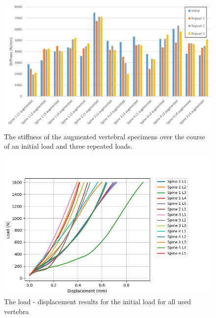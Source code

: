 \begin{figure}[ht!]
  \centering
 
\includegraphics[width=\textwidth]{Chapters/Chapter_HT_images/experimental_repeats.png}
  \caption{The stiffness of the augmented vertebral specimens over the course
    of an initial load and three repeated loads.}
  \label{fig:exp_repeats}
\end{figure}


\begin{figure}[ht!]
  \centering
  \includegraphics[width=\textwidth]{Chapters/Chapter_HT_images/All_int_LD.png}
  \caption{The load - displacement results for the initial load for all used vertebra}
  \label{fig:allLD}
\end{figure}

